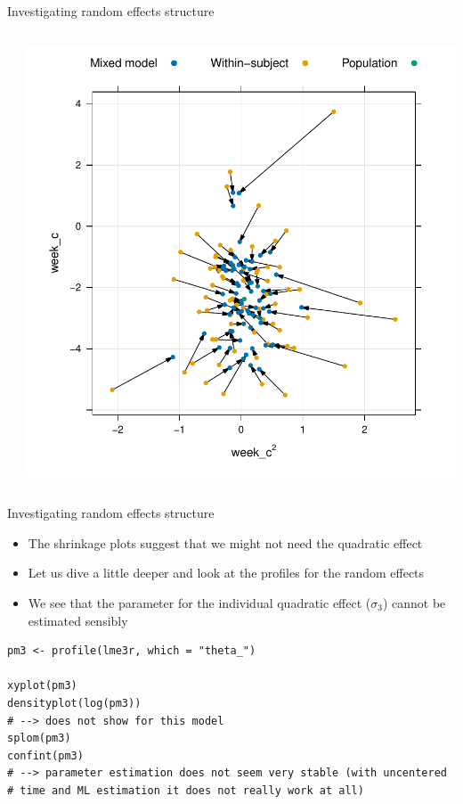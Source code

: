 \documentclass[aspectratio=169]{beamer}
\begin{document}
\begin{frame}[fragile]{Investigating random effects structure}
\begin{columns}
\begin{column}{.35\textwidth}
    \end{column}
    \begin{column}{.35\textwidth}
      \includegraphics[scale=.35]{../figures/hdrs_shrinkage_week-weeksq}
    \end{column}
  \end{columns}
\end{frame}

\begin{frame}[fragile]{Investigating random effects structure}
  \begin{itemize}
    \item The shrinkage plots suggest that we might not need the quadratic
      effect
    \item Let us dive a little deeper and look at the profiles for the random
      effects
    \item We see that the parameter for the individual quadratic effect
      ($\sigma_3$) cannot be estimated sensibly
  \end{itemize}
\begin{lstlisting}
pm3 <- profile(lme3r, which = "theta_")

xyplot(pm3)
densityplot(log(pm3))
# --> does not show for this model
splom(pm3)
confint(pm3)
# --> parameter estimation does not seem very stable (with uncentered
# time and ML estimation it does not really work at all)
\end{lstlisting}
\end{frame}
\end{document}
